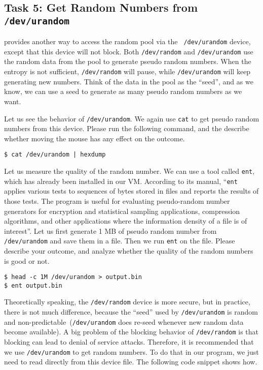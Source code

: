 \subsection{Task 5: Get Random Numbers from {\tt /dev/urandom}}

\linux provides another way to access the random pool via the {\tt
/dev/urandom} device, except that this device will not block.
Both {\tt /dev/random} and {\tt /dev/urandom} use the random data
from the pool to generate pseudo random numbers. When the entropy 
is not sufficient, {\tt /dev/random} will pause, while {\tt /dev/urandom} will
keep generating new numbers. Think of the data in the pool as 
the ``seed'', and as we know, we can use a seed to generate as many 
pseudo random numbers as we want. 

Let us see the behavior of \texttt{/dev/urandom}. 
We again use \texttt{cat} to get pseudo random
numbers from this device. Please run the following command, and 
the describe whether 
moving the mouse has any effect on the outcome. 

\begin{lstlisting}
$ cat /dev/urandom | hexdump
\end{lstlisting}



Let us measure the quality of the random number. We can use a tool called \texttt{ent}, which
has already been installed in our VM. 
According to its manual, ``\texttt{ent} applies various tests to sequences of bytes stored in files and
reports the results of those tests. The program is useful for evaluating pseudo-random number
generators for encryption and statistical sampling applications, compression algorithms, and
other applications where the information density of a file is of interest''.  Let
us first generate 1 MB of pseudo random number from \texttt{/dev/urandom} and 
save them in a file. Then we run \texttt{ent} on the file. Please describe your 
outcome, and analyze whether the quality of the random numbers is good or not. 


\begin{lstlisting}
$ head -c 1M /dev/urandom > output.bin
$ ent output.bin
\end{lstlisting}
 



Theoretically speaking, the
{\tt /dev/random} device is more secure, but in practice, 
there is not much difference, because the ``seed'' used by 
\texttt{/dev/urandom} is random and non-predictable~(\texttt{/dev/urandom} 
does re-seed whenever new random data become available). 
A big problem of the blocking behavior of \texttt{/dev/random} is that
blocking can lead to denial of service attacks.
Therefore, it is recommended that we use {\tt /dev/urandom} to get random 
numbers. To do that in our program, we 
just need to read directly from this device file. The following code 
snippet shows how.


